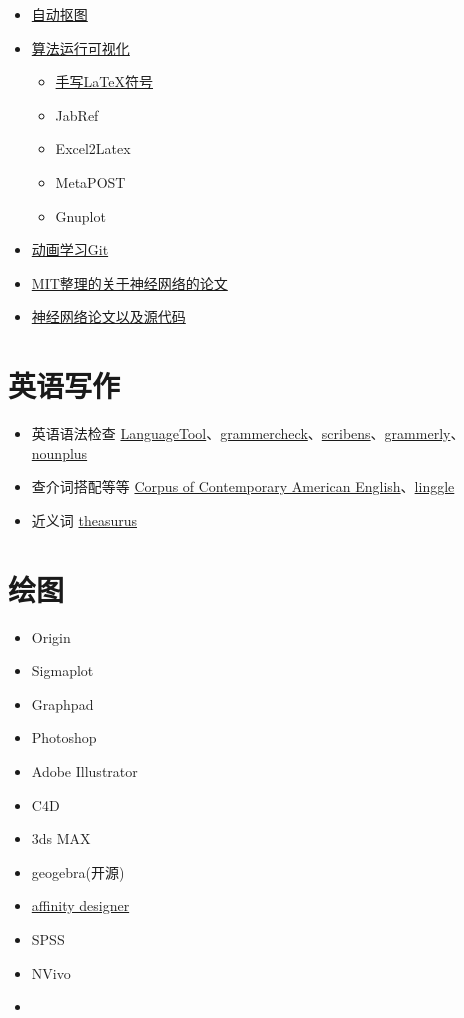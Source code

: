 \documentclass[UTF8,oneside]{ctexbook}
\begin{document}
\begin{itemize}
	\item \href{https://www.remove.bg}{自动抠图}
	\item \href{https://algorithm-visualizer.org}{算法运行可视化}
	\begin{itemize}
		\item \href{http://detexify.kirelabs.org/classify.html}{手写LaTeX符号}
		\item JabRef
		\item Excel2Latex
		\item MetaPOST
		\item Gnuplot
	\end{itemize}
	\item \href{https://learngitbranching.js.org/?demo}{动画学习Git}
	\item \href{https://www.stateoftheart.ai}{MIT整理的关于神经网络的论文}
	\item \href{https://github.com/lonelybag/pwc}{神经网络论文以及源代码}
\end{itemize}

\section{英语写作}
\begin{itemize}
	\item 英语语法检查 \href{https://languagetool.org}{LanguageTool}、\href{https://www.grammarcheck.net}{grammercheck}、\href{https://www.scribens.com}{scribens}、\href{https://www.grammarly.com}{grammerly}、\href{https://www.nounplus.net}{nounplus}
	\item 查介词搭配等等 \href{https://www.english-corpora.org/coca/}{ Corpus of Contemporary American English}、\href{https://www.lintcode.com}{linggle}
	\item 近义词 \href{https://www.thesaurus.com}{theasurus}
\end{itemize}

\section{绘图}
\begin{itemize}
	\item Origin
	\item Sigmaplot
	\item Graphpad
	\item Photoshop
	\item Adobe Illustrator
	\item C4D
	\item 3ds MAX
	\item geogebra(开源)
	\item \href{https://affinity.serif.com/zh-cn/designer/}{affinity designer}
	\item SPSS
	\item NVivo
	\item 
\end{itemize}
\end{document}
